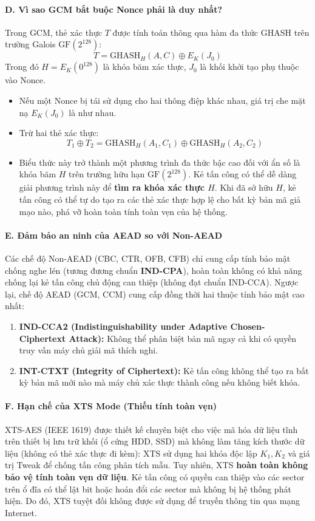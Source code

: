 \documentclass[12pt, a4paper]{report}
\begin{document}
\paragraph{D. Vì sao GCM bắt buộc Nonce phải là duy nhất?}
Trong GCM, thẻ xác thực $T$ được tính toán thông qua hàm đa thức GHASH trên trường Galois $\text{GF}(2^{128})$:
\[ T = \text{GHASH}_H(A, C) \oplus E_K(J_0) \]
Trong đó $H = E_K(0^{128})$ là khóa băm xác thực, $J_0$ là khối khởi tạo phụ thuộc vào Nonce.
\begin{itemize}
    \item Nếu một Nonce bị tái sử dụng cho hai thông điệp khác nhau, giá trị che mặt nạ $E_K(J_0)$ là như nhau.
    \item Trừ hai thẻ xác thực:
    \[ T_1 \oplus T_2 = \text{GHASH}_H(A_1, C_1) \oplus \text{GHASH}_H(A_2, C_2) \]
    \item Biểu thức này trở thành một phương trình đa thức bậc cao đối với ẩn số là khóa băm $H$ trên trường hữu hạn $\text{GF}(2^{128})$. Kẻ tấn công có thể dễ dàng giải phương trình này để \textbf{tìm ra khóa xác thực $H$}. Khi đã sở hữu $H$, kẻ tấn công có thể tự do tạo ra các thẻ xác thực hợp lệ cho bất kỳ bản mã giả mạo nào, phá vỡ hoàn toàn tính toàn vẹn của hệ thống.
\end{itemize}

\paragraph{E. Đảm bảo an ninh của AEAD so với Non-AEAD}
Các chế độ Non-AEAD (CBC, CTR, OFB, CFB) chỉ cung cấp tính bảo mật chống nghe lén (tương đương chuẩn \textbf{IND-CPA}), hoàn toàn không có khả năng chống lại kẻ tấn công chủ động can thiệp (không đạt chuẩn IND-CCA). Ngược lại, chế độ AEAD (GCM, CCM) cung cấp đồng thời hai thuộc tính bảo mật cao nhất:
\begin{enumerate}
    \item \textbf{IND-CCA2 (Indistinguishability under Adaptive Chosen-Ciphertext Attack):} Không thể phân biệt bản mã ngay cả khi có quyền truy vấn máy chủ giải mã thích nghi.
    \item \textbf{INT-CTXT (Integrity of Ciphertext):} Kẻ tấn công không thể tạo ra bất kỳ bản mã mới nào mà máy chủ xác thực thành công nếu không biết khóa.
\end{enumerate}

\paragraph{F. Hạn chế của XTS Mode (Thiếu tính toàn vẹn)}
XTS-AES (IEEE 1619) được thiết kế chuyên biệt cho việc mã hóa dữ liệu tĩnh trên thiết bị lưu trữ khối (ổ cứng HDD, SSD) mà không làm tăng kích thước dữ liệu (không có thẻ xác thực đi kèm): XTS sử dụng hai khóa độc lập $K_1, K_2$ và giá trị Tweak để chống tấn công phân tích mẫu. Tuy nhiên, XTS \textbf{hoàn toàn không bảo vệ tính toàn vẹn dữ liệu}. Kẻ tấn công có quyền can thiệp vào các sector trên ổ đĩa có thể lật bit hoặc hoán đổi các sector mà không bị hệ thống phát hiện. Do đó, XTS tuyệt đối không được sử dụng để truyền thông tin qua mạng Internet.
\end{document}
